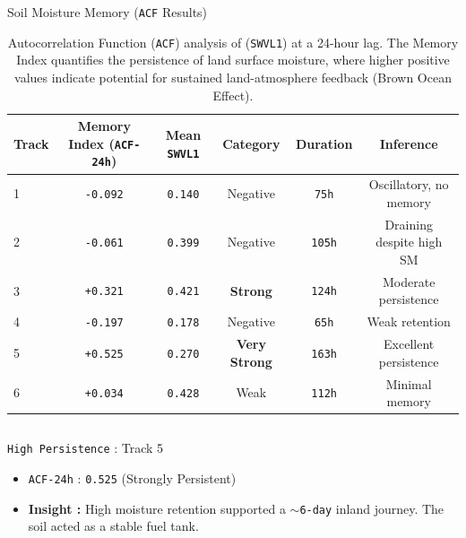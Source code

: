 \documentclass[8pt, aspectratio=169]{beamer}
\begin{document}
\begin{frame}{Soil Moisture Memory (\texttt{ACF} Results)}
    \vspace{-0.5cm}
    \footnotesize
    \begin{center}
        \begin{table}
            \centering
            \caption{\footnotesize Autocorrelation Function (\texttt{ACF}) analysis of (\texttt{SWVL1}) at a 24-hour lag. The Memory Index quantifies the persistence of land surface moisture, where higher positive values indicate potential for sustained land-atmosphere feedback (Brown Ocean Effect).}
            \begin{tabular}{lccccc}
                \toprule
                \textbf{Track} & \textbf{Memory Index (\texttt{ACF-24h})} & \textbf{Mean \texttt{SWVL1}} & \textbf{Category}    & \textbf{Duration} & \textbf{Inference}       \\
                \midrule
                1              & \texttt{-0.092}              & \texttt{0.140}               & Negative             & \texttt{75h}               & Oscillatory, no memory   \\
                2              & \texttt{-0.061}              & \texttt{0.399}               & Negative             & \texttt{105h}              & Draining despite high SM \\
                3              & \texttt{+0.321}              & \texttt{0.421}               & \textbf{Strong}      & \texttt{124h}              & Moderate persistence     \\
                4              & \texttt{-0.197}              & \texttt{0.178}               & Negative             & \texttt{65h}               & Weak retention           \\
                5              & \texttt{+0.525}              & \texttt{0.270}               & \textbf{Very Strong} & \texttt{163h}              & Excellent persistence    \\
                6              & \texttt{+0.034}              & \texttt{0.428}               & Weak                 & \texttt{112h}              & Minimal memory           \\
                \bottomrule
            \end{tabular}
        \end{table}
    \end{center}

    \vspace{0.1cm}
    \begin{columns}[T]
        \begin{block}{\footnotesize \texttt{High Persistence} : Track 5}
            \footnotesize
            \begin{itemize}
                \item \texttt{ACF-24h} : \texttt{0.525} (Strongly Persistent)
                \item \textbf{Insight :} High moisture retention supported a \texttt{$\sim$6-day} inland journey. The soil acted as a stable fuel tank.
            \end{itemize}
        \end{block}


\end{columns}
\end{frame}
\end{document}
